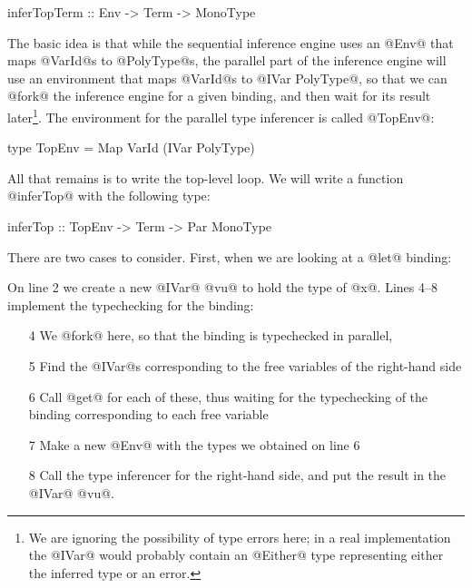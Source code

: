 \begin{haskell}
inferTopTerm :: Env -> Term -> MonoType
\end{haskell}

The basic idea is that while the sequential inference engine uses an
@Env@ that maps @VarId@s to @PolyType@s, the parallel part of the
inference engine will use an environment that maps @VarId@s to
@IVar PolyType@, so that we can @fork@ the inference engine for a
given binding, and then wait for its result later\footnote{We are
  ignoring the possibility of type errors here; in a real
  implementation the @IVar@ would probably contain an @Either@ type
  representing either the inferred type or an error.}.  The environment
for the parallel type inferencer is called @TopEnv@:

\begin{haskell}
type TopEnv = Map VarId (IVar PolyType)
\end{haskell}

All that remains is to write the top-level loop.  We will write a
function @inferTop@ with the following type:

\begin{haskell}
inferTop :: TopEnv -> Term -> Par MonoType
\end{haskell}

\noindent There are two cases to consider.  First, when we are looking at a
@let@ binding:


\noindent On line 2 we create a new @IVar@ @vu@ to hold the type of @x@.  Lines
4--8 implement the typechecking for the binding:

\begin{itemize}
\item [4] We @fork@ here, so that the binding is typechecked in
  parallel,
\item [5] Find the @IVar@s corresponding to the free variables of the right-hand side
\item [6] Call @get@ for each of these, thus waiting for the
  typechecking of the binding corresponding to each free variable
\item [7] Make a new @Env@ with the types we obtained on line 6
\item [8] Call the type inferencer for the right-hand side, and put the
  result in the @IVar@ @vu@.
\end{itemize}

